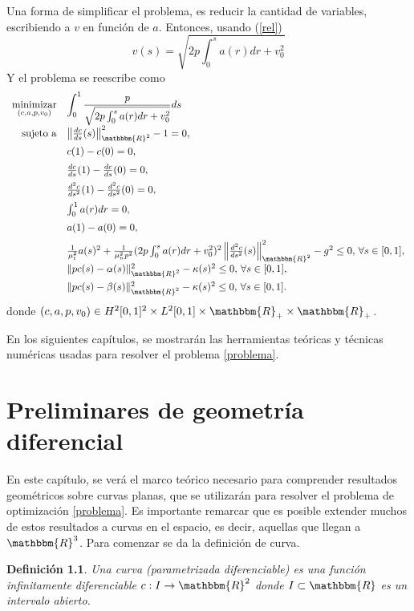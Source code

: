 \documentclass[a4paper,10pt]{book}
\newcommand{\R}{\mathbbm{R}}
\newcommand{\arr}{\rightarrow}
\newtheorem{defi}[teo]{Definici\'on}
\begin{document}
Una forma de simplificar el problema, es reducir la cantidad de variables, escribiendo a $v$ en función de $a$. Entonces, usando (\ref{rel}) 
\begin{equation}\label{vel}
v(s)=\sqrt{2p \int_0^s a(r)dr + v_0^2}
\end{equation}
Y el problema se reescribe como
\begin{equation}\label{problema}
\begin{array}{rl}
\displaystyle \mathop{\mathrm{minimizar}}_{(c,a,p,v_0)} & \displaystyle \int_{0}^{1} \frac{p}{\sqrt{2p \int_0^s a(r)dr + v_0^2}}ds \\
 \mathrm{sujeto \ a} & \left\|\frac{dc}{ds}(s)\right\|_{\R^2}^2-1=0,\\[2mm]
                     & c(1)-c(0)=0,\\[2mm]
                     & \frac{dc}{ds}(1)-\frac{dc}{ds}(0)=0,\\[2mm]
                     & \frac{d^2c}{ds^2}(1)-\frac{d^2c}{ds^2}(0)=0,\\[2mm]
                     & \int_{0}^{1} a(r)dr=0,\\[2mm]
                     & a(1)-a(0)=0,\\[2mm]
                     & \frac{1}{\mu_t^2} a(s)^2 + \frac{1}{\mu_n^2 p^2}(2p \int_0^s a(r)dr + v_0^2)^2\left\| \frac{d^2 c}{ds^2}(s) \right\|_{\R^2}^2-g^2\leq 0,\,\forall s\in[0,1],\\[2mm]
                     &  \|pc(s)-\alpha(s)\|_{\R^2}^2-\kappa(s)^2 \leq 0,\,\forall s\in[0,1], \\[2mm]
                     &  \|pc(s)-\beta(s)\|_{\R^2}^2-\kappa(s)^2 \leq 0, \,\forall s\in[0,1].

  \end{array}
\end{equation}
donde $(c,a,p,v_0)\in H^2[0,1]^2 \times L^2[0,1]\times \R_+\times \R_+$. 

En los siguientes capítulos, se mostrarán las herramientas teóricas y técnicas numéricas usadas para resolver el problema \eqref{problema}.

\chapter{Preliminares de geometría diferencial}\label{reparametr}

En este capítulo, se verá el marco teórico necesario para comprender resultados geométricos sobre curvas planas, que se utilizarán para resolver el problema de optimización \eqref{problema}. Es importante remarcar que es posible extender muchos de estos resultados a curvas en el espacio, es decir, aquellas que llegan a $\R^3$. Para comenzar se da la definición de curva.
\begin{defi}
 Una curva (parametrizada diferenciable) es una función infinitamente diferenciable $c:I\arr\R^2$ donde $I\subset\R$ es un intervalo abierto.
\end{defi}
\end{document}
